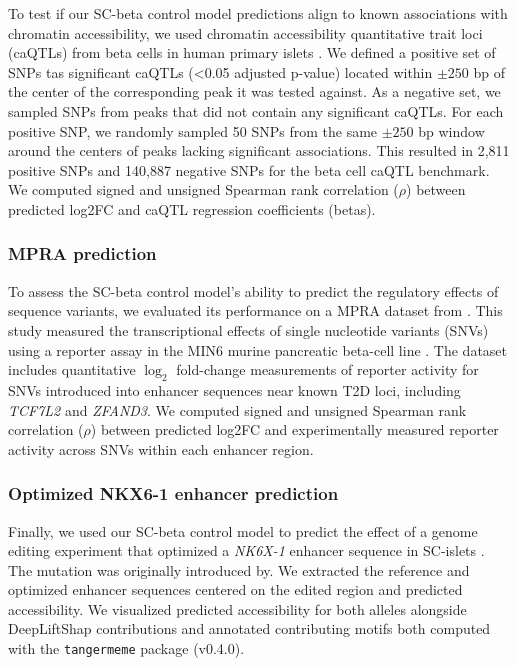 To test if our SC-beta control model predictions align to known associations with chromatin accessibility, we used chromatin accessibility quantitative trait loci (caQTLs) from beta cells in human primary islets \cite{Mummey2024-kx}. We defined a positive set of SNPs tas significant caQTLs (<0.05 adjusted p-value) located within \(\pm250\) bp of the center of the corresponding peak it was tested against. As a negative set, we sampled SNPs from peaks that did not contain any significant caQTLs. For each positive SNP, we randomly sampled 50 SNPs from the same \(\pm250\) bp window around the centers of peaks lacking significant associations. This resulted in 2,811 positive SNPs and 140,887 negative SNPs for the beta cell caQTL benchmark. We computed signed and unsigned Spearman rank correlation (\(\rho\)) between predicted log2FC and caQTL regression coefficients (betas).

\subsubsection{MPRA prediction}

To assess the SC-beta control model’s ability to predict the regulatory effects of sequence variants, we evaluated its performance on a MPRA dataset from \cite{Kircher2019-di}. This study measured the transcriptional effects of single nucleotide variants (SNVs) using a reporter assay in the MIN6 murine pancreatic beta-cell line \cite{Miyazaki1990-zz}. The dataset includes quantitative \(\log_2\) fold-change measurements of reporter activity for SNVs introduced into enhancer sequences near known T2D loci, including \textit{TCF7L2} and \textit{ZFAND3}. We computed signed and unsigned Spearman rank correlation (\(\rho\)) between predicted log2FC and experimentally measured reporter activity across SNVs within each enhancer region.

\subsubsection{Optimized NKX6-1 enhancer prediction}

Finally, we used our SC-beta control model to predict the effect of a genome editing experiment that optimized a \textit{NK6X-1} enhancer sequence in SC-islets \cite{Geusz2021-mr}. The mutation was originally introduced by. We extracted the reference and optimized enhancer sequences centered on the edited region and predicted accessibility. We visualized predicted accessibility for both alleles alongside DeepLiftShap contributions and annotated contributing motifs both computed with the \texttt{tangermeme} package (v0.4.0).

